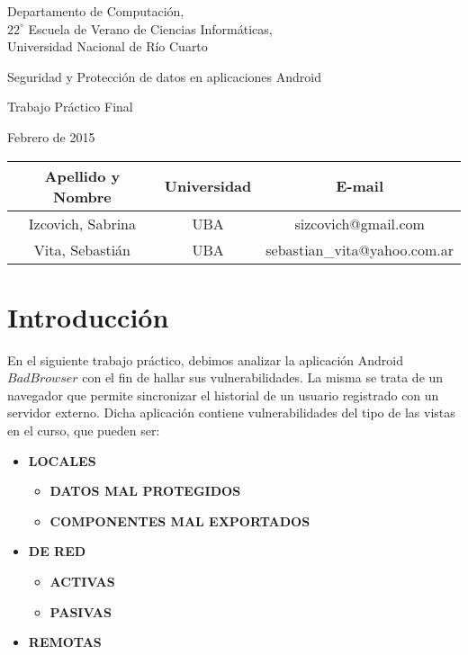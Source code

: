 \documentclass[10pt, a4paper]{article}
\author{Seguridad Android.}
\date{}								%
\begin{document}
\thispagestyle{caratula}

\begin{center}

\vspace{2cm}

Departamento de Computación,\\
$22^{\circ}$ Escuela de Verano de Ciencias Informáticas,\\
Universidad Nacional de Río Cuarto

\vspace{4cm}

\begin{Huge}
Seguridad y Protección de datos en aplicaciones Android\end{Huge}

\vspace{0.5cm}

\begin{huge}
Trabajo Práctico Final
\end{huge}

\vspace{1cm}

Febrero de 2015

\vspace{10cm}


\vspace{1cm}

\begin{tabular}{|c|c|c|}
\hline
Apellido y Nombre & Universidad & E-mail\\
\hline
Izcovich, Sabrina     & UBA & sizcovich@gmail.com\\
Vita, Sebastián       & UBA & sebastian\_vita@yahoo.com.ar\\
\hline
\end{tabular}

\end{center}

\newpage

\section{Introducción}
En el siguiente trabajo práctico, debimos analizar la aplicación Android $BadBrowser$ con el fin de hallar sus vulnerabilidades. La misma se trata de un navegador que permite sincronizar el historial de un usuario registrado con un servidor externo. Dicha aplicación contiene vulnerabilidades del tipo de las vistas en el curso, que pueden ser:
\begin{itemize}
\item \textbf{LOCALES}
\begin{itemize}
\item \textbf{DATOS MAL PROTEGIDOS}
\item \textbf{COMPONENTES MAL EXPORTADOS}
\end{itemize}
\item \textbf{DE RED}
\begin{itemize}
\item \textbf{ACTIVAS}
\item \textbf{PASIVAS}
\end{itemize}
\item \textbf{REMOTAS}
\end{itemize}
\end{document}
